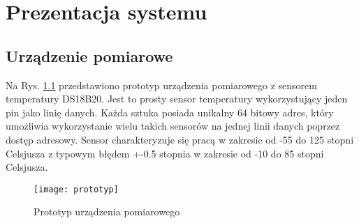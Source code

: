 \chapter{Prezentacja systemu}

\section{Urządzenie pomiarowe}
Na Rys. \ref{prototyp} przedstawiono prototyp urządzenia pomiarowego z sensorem
temperatury DS18B20. Jest to prosty sensor temperatury wykorzystujący jeden
pin jako linię danych. Każda sztuka posiada unikalny 64 bitowy adres, który
umożliwia wykorzystanie wielu takich sensorów na jednej linii danych poprzez
dostęp adresowy. Sensor charakteryzuje się pracą w zakresie od -55 do 125 stopni 
Celsjusza z typowym błędem +-0.5 stopnia w zakresie od -10 do 85 stopni Celsjusza.
\begin{figure}[h!]
  \centering
  \texttt{[image: prototyp]}
  \caption{Prototyp urządzenia pomiarowego}
  \label{prototyp}
\end{figure}

